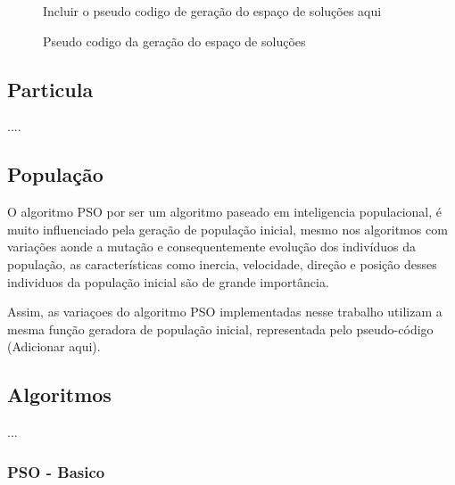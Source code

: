             \begin{figure}[h]
                \centering
                \small{Incluir o pseudo codigo de geração do espaço de soluções aqui}
                \caption{Pseudo codigo da geração do espaço de soluções}
                \label{fig:pseudocodigo-solutionspace}
            \end{figure}
        


    \subsection{Particula}
        ....


    \subsection{População}
        O algoritmo PSO por ser um algoritmo paseado em inteligencia populacional, é muito influenciado pela geração de população inicial, mesmo nos algoritmos com variações aonde a mutação e consequentemente evolução dos indivíduos da população, as características como inercia, velocidade, direção e posição desses individuos da população inicial são de grande importância.\newline


        


        Assim, as variaçoes do algoritmo PSO implementadas nesse trabalho utilizam a mesma função geradora de população inicial, representada pelo pseudo-código   (Adicionar aqui).


    \subsection{Algoritmos}
            ...

        \subsubsection{PSO - Basico}

